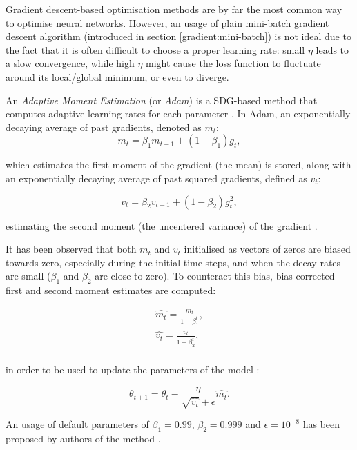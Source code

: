 Gradient descent-based optimisation methods are by far the most common way to optimise neural networks. However, an usage of plain mini-batch gradient descent algorithm (introduced in section \ref{gradient:mini-batch}) is not ideal due to the fact that it is often difficult to choose a proper learning rate: small $\eta$ leads to a slow convergence, while high $\eta$ might cause the loss function to fluctuate around its local/global minimum, or even to diverge.

An \emph{Adaptive Moment Estimation} (or \emph{Adam}) is a SDG-based method that computes adaptive learning rates for each parameter \cite{adam:paper}. In Adam, an exponentially decaying average of past gradients, denoted as $m_t$:
\begin{equation}
m_t = \beta_1 m_{t-1} + (1 - \beta_1) g_t,
\end{equation}

which estimates the first moment of the gradient (the mean) is stored, along with an exponentially decaying average of past squared gradients, defined as $v_t$:

\begin{equation}
v_t = \beta_2 v_{t-1} + (1 - \beta_2)g_t^2,
\end{equation}

estimating the second moment (the uncentered variance) of the gradient \cite{ruder:sdgsadam}. 

It has been observed that both $m_t$ and $v_t$ initialised as vectors of zeros are biased towards zero, especially during the initial time steps, and when the decay rates are small ($\beta_1$ and $\beta_2$ are close to zero). To counteract this bias, bias-corrected first and second moment estimates are computed:

\begin{equation}
\begin{split}
\hat{m_t} = \frac{m_t}{1 - \beta_1^t},\\
\hat{v_t} = \frac{v_t}{1 - \beta_2^t},\\
\end{split}
\end{equation}

in order to be used to update the parameters of the model \cite{ruder:sdgsadam}:

\begin{equation}
\theta_{t+1} = \theta_t - \frac{\eta}{\sqrt{\hat{v_t}} + \epsilon} \hat{m_t}.
\end{equation}

An usage of default parameters of $\beta_1 = 0.99$, $\beta_2 = 0.999$ and $\epsilon = 10^{-8}$ has been proposed by authors of the method \cite{adam:paper}.

